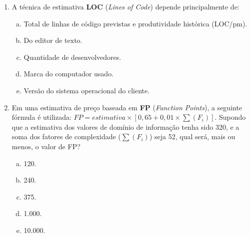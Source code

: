\documentclass{beamer}
\begin{document}
\begin{frame}
    \begin{enumerate}
        \justifying
        \setcounter{enumi}{12}
        \item<1-2> A técnica de estimativa \textbf{LOC} (\textit{Lines of Code}) depende principalmente de:
        \begin{enumerate}[a)]
            \justifying
            \item<1-2> \alert<2>{Total de linhas de código previstas e produtividade histórica (LOC/pm)}.
            \item<1-2> Do editor de texto.
            \item<1-2> Quantidade de desenvolvedores.
            \item<1-2> Marca do computador usado.
            \item<1-2> Versão do sistema operacional do cliente.
        \end{enumerate}
        \item<3-4> Em uma estimativa de preço baseada em \textbf{FP} (\textit{Function Points}), a seguinte fórmula é utilizada: $FP = estimativa \times [0,65 + 0,01 \times \sum(F_i)]$. Supondo que a estimativa dos valores de domínio de informação tenha sido 320, e a soma dos fatores de complexidade ($\sum(F_i)$) seja 52, qual será, mais ou menos, o valor de FP?
        \begin{enumerate}[a)]
            \justifying
            \item<3-4> 120.
            \item<3-4> 240.
            \item<3-4> \alert<4>{375}.
            \item<3-4> 1.000.
            \item<3-4> 10.000.
        \end{enumerate}
    \end{enumerate}
\end{frame}
\end{document}

